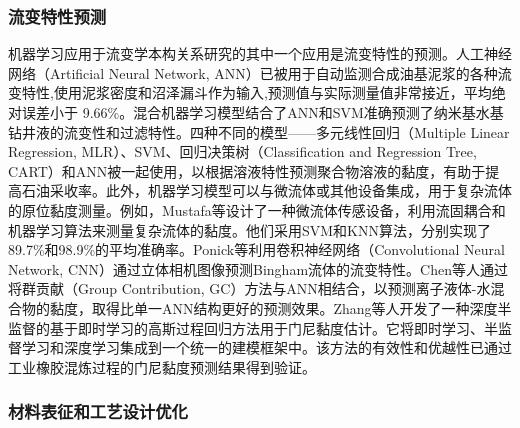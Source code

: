 \subsubsection{流变特性预测}
机器学习应用于流变学本构关系研究的其中一个应用是流变特性的预测。人工神经网络（ ​​Artificial Neural Network, ANN）已被用于自动监测合成油基泥浆的各种流变特性,使用泥浆密度和沼泽漏斗作为输入,预测值与实际测量值非常接近，平均绝对误差小于 9.66\%\cite{alsabaaMachineLearningModel2022}。混合机器学习模型结合了ANN和SVM准确预测了纳米基水基钻井液的流变性和过滤特性。四种不同的模型——多元线性回归（Multiple Linear Regression, MLR）、SVM、回归决策树（Classification and Regression Tree, CART）和ANN被一起使用，以根据溶液特性预测聚合物溶液的黏度，有助于提高石油采收率\cite{shakeel2023application}。此外，机器学习模型可以与微流体或其他设备集成，用于复杂流体的原位黏度测量。例如，Mustafa等设计了一种微流体传感设备，利用流固耦合和机器学习算法来测量复杂流体的黏度\cite{mustafaMachineLearningBased2023}。他们采用SVM和KNN算法，分别实现了89.7\%和98.9\%的平均准确率。Ponick等利用卷积神经网络（​​Convolutional Neural Network, CNN）通过立体相机图像预测Bingham流体的流变特性\cite{Ponick2022}。Chen等人通过将群贡献（Group Contribution, GC）方法与ANN相结合，以预测离子液体-水混合物的黏度\cite{CHEN2022118546}，取得比单一ANN结构更好的预测效果。Zhang等人开发了一种深度半监督的基于即时学习的高斯过程回归方法用于门尼黏度估计\cite{polym14051018}。它将即时学习、半监督学习和深度学习集成到一个统一的建模框架中。该方法的有效性和优越性已通过工业橡胶混炼过程的门尼黏度预测结果得到验证。

\subsubsection{材料表征和工艺设计优化}

